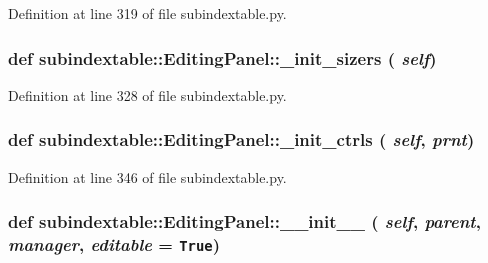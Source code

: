 Definition at line 319 of file subindextable.py.\hypertarget{classsubindextable_1_1EditingPanel_223610e27a64a602776d6f35ca8040ff}{
\subsubsection[\_\-init\_\-sizers]{\setlength{\rightskip}{0pt plus 5cm}def subindextable::Editing\-Panel::\_\-init\_\-sizers ( {\em self})}}
\label{classsubindextable_1_1EditingPanel_223610e27a64a602776d6f35ca8040ff}




Definition at line 328 of file subindextable.py.\hypertarget{classsubindextable_1_1EditingPanel_d8ad09b717e5c11919397a2929452b36}{
\subsubsection[\_\-init\_\-ctrls]{\setlength{\rightskip}{0pt plus 5cm}def subindextable::Editing\-Panel::\_\-init\_\-ctrls ( {\em self},  {\em prnt})}}
\label{classsubindextable_1_1EditingPanel_d8ad09b717e5c11919397a2929452b36}




Definition at line 346 of file subindextable.py.\hypertarget{classsubindextable_1_1EditingPanel_487656ac452a6f151527114f2a095cb0}{
\subsubsection[\_\-\_\-init\_\-\_\-]{\setlength{\rightskip}{0pt plus 5cm}def subindextable::Editing\-Panel::\_\-\_\-init\_\-\_\- ( {\em self},  {\em parent},  {\em manager},  {\em editable} = {\tt True})}}
\label{classsubindextable_1_1EditingPanel_487656ac452a6f151527114f2a095cb0}




